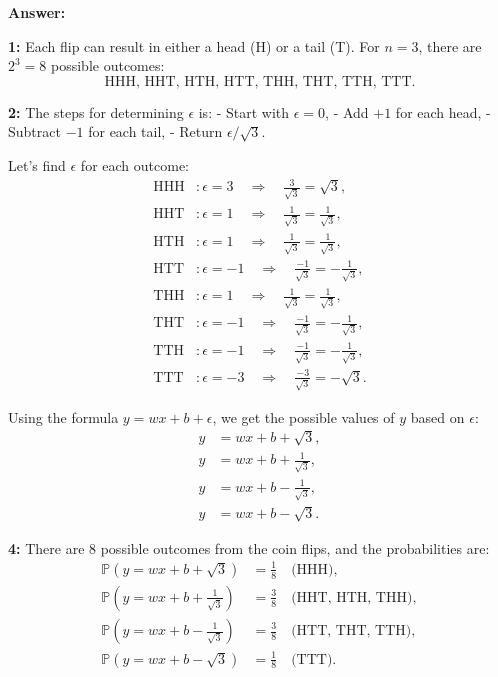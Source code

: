 \documentclass{article}
\begin{document}
\begin{tcolorbox}
\textbf{Answer: }


\textbf{1:}
Each flip can result in either a head (H) or a tail (T). For \( n = 3 \), there are \( 2^3 = 8 \) possible outcomes:
\[
\text{HHH, HHT, HTH, HTT, THH, THT, TTH, TTT}.
\]

\textbf{2: }
The steps for determining \( \epsilon \) is:
- Start with \( \epsilon = 0 \),
- Add \( +1 \) for each head,
- Subtract \( -1 \) for each tail,
- Return \( \epsilon / \sqrt{3} \).

Let’s find \( \epsilon \) for each outcome:
\[
\begin{aligned}
    \text{HHH} &: \epsilon = 3 \quad \Rightarrow \quad \frac{3}{\sqrt{3}} = \sqrt{3}, \\
    \text{HHT} &: \epsilon = 1 \quad \Rightarrow \quad \frac{1}{\sqrt{3}} = \frac{1}{\sqrt{3}}, \\
    \text{HTH} &: \epsilon = 1 \quad \Rightarrow \quad \frac{1}{\sqrt{3}} = \frac{1}{\sqrt{3}}, \\
    \text{HTT} &: \epsilon = -1 \quad \Rightarrow \quad \frac{-1}{\sqrt{3}} = -\frac{1}{\sqrt{3}}, \\
    \text{THH} &: \epsilon = 1 \quad \Rightarrow \quad \frac{1}{\sqrt{3}} = \frac{1}{\sqrt{3}}, \\
    \text{THT} &: \epsilon = -1 \quad \Rightarrow \quad \frac{-1}{\sqrt{3}} = -\frac{1}{\sqrt{3}}, \\
    \text{TTH} &: \epsilon = -1 \quad \Rightarrow \quad \frac{-1}{\sqrt{3}} = -\frac{1}{\sqrt{3}}, \\
    \text{TTT} &: \epsilon = -3 \quad \Rightarrow \quad \frac{-3}{\sqrt{3}} = -\sqrt{3}.
\end{aligned}
\]

\textbf{}
Using the formula \( y = wx + b + \epsilon \), we get the possible values of \( y \) based on \( \epsilon \):
\[
\begin{aligned}
    y &= wx + b + \sqrt{3}, \\
    y &= wx + b + \frac{1}{\sqrt{3}}, \\
    y &= wx + b - \frac{1}{\sqrt{3}}, \\
    y &= wx + b - \sqrt{3}.
\end{aligned}
\]

\textbf{4:}
There are 8 possible outcomes from the coin flips, and the probabilities are:
\[
\begin{aligned}
    \mathbb{P}(y = wx + b + \sqrt{3}) &= \frac{1}{8} \quad \text{(HHH)}, \\
    \mathbb{P}(y = wx + b + \frac{1}{\sqrt{3}}) &= \frac{3}{8} \quad \text{(HHT, HTH, THH)}, \\
    \mathbb{P}(y = wx + b - \frac{1}{\sqrt{3}}) &= \frac{3}{8} \quad \text{(HTT, THT, TTH)}, \\
    \mathbb{P}(y = wx + b - \sqrt{3}) &= \frac{1}{8} \quad \text{(TTT)}.
\end{aligned}
\]


\end{tcolorbox}
\end{document}
